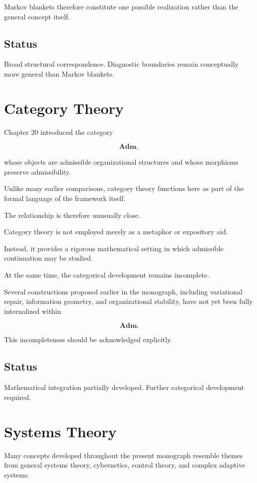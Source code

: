 \documentclass[11pt,oneside]{book}
\numberwithin{equation}{chapter}
\theoremstyle{definition}
\theoremstyle{plain}
\begin{document}
Markov blankets therefore constitute one possible realization rather than
the general concept itself.

\subsection*{Status}

Broad structural correspondence. Diagnostic boundaries remain conceptually
more general than Markov blankets.

\section{Category Theory}

Chapter 20 introduced the category

\[
\mathbf{Adm},
\]

whose objects are admissible organizational structures and whose morphisms
preserve admissibility.

Unlike many earlier comparisons, category theory functions here as part of
the formal language of the framework itself.

The relationship is therefore unusually close.

Category theory is not employed merely as a metaphor or expository aid.

Instead, it provides a rigorous mathematical setting in which admissible
continuation may be studied.

At the same time, the categorical development remains incomplete.

Several constructions proposed earlier in the monograph, including
variational repair, information geometry, and organizational stability,
have not yet been fully internalized within

\[
\mathbf{Adm}.
\]

This incompleteness should be acknowledged explicitly.

\subsection*{Status}

Mathematical integration partially developed. Further categorical
development required.

\section{Systems Theory}

Many concepts developed throughout the present monograph resemble themes
from general systems theory, cybernetics, control theory, and complex
adaptive systems.
\end{document}
